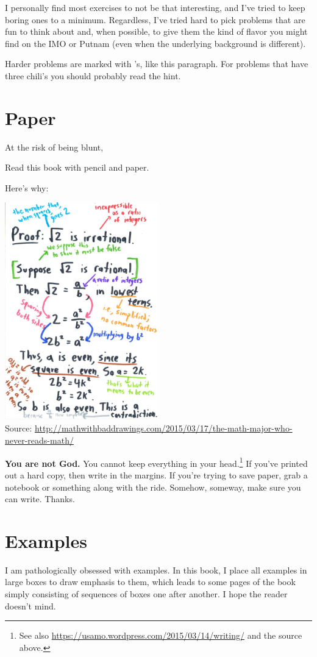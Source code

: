 I personally find most exercises to not be that interesting, and I've tried to keep boring ones to a minimum.
Regardless, I've tried hard to pick problems that are fun to think about and, when possible, to give them
the kind of flavor you might find on the IMO or Putnam (even when the underlying background is different).

\gim
Harder problems are marked with \chili's, like this paragraph.
For problems that have three chili's you should probably read the hint.

\section{Paper}
At the risk of being blunt,
\begin{moral}
Read this book with pencil and paper.
\end{moral}
Here's why:

\begin{center}
	\includegraphics[width=0.5\textwidth]{media/read-with-pencil.jpg} \\
	{\footnotesize Source: \url{http://mathwithbaddrawings.com/2015/03/17/the-math-major-who-never-reads-math/}}
\end{center}
\textbf{You are not God.}
You cannot keep everything in your head.\footnote{
	See also \url{https://usamo.wordpress.com/2015/03/14/writing/} and the source above.
}
If you've printed out a hard copy, then write in the margins.
If you're trying to save paper, grab a notebook or something along with the ride.
Somehow, someway, make sure you can write. Thanks.


\section{Examples}
I am pathologically obsessed with examples.
In this book, I place all examples in large boxes to draw emphasis to them,
which leads to some pages of the book simply consisting of sequences of boxes
one after another. I hope the reader doesn't mind.

